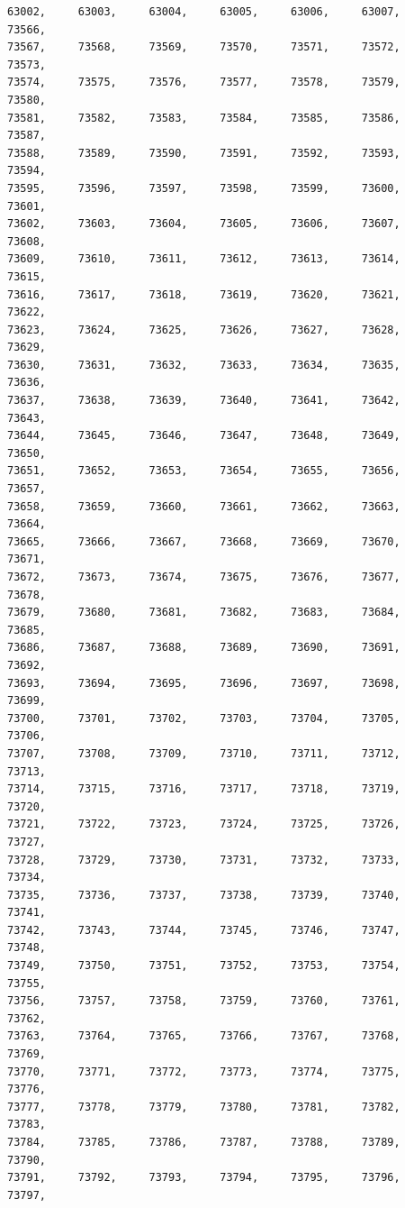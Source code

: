 \documentclass[a4paper,11pt]{report}
\begin{document}
\begin{verbatim}
63002,     63003,     63004,     63005,     63006,     63007,     73566,     
73567,     73568,     73569,     73570,     73571,     73572,     73573,     
73574,     73575,     73576,     73577,     73578,     73579,     73580,     
73581,     73582,     73583,     73584,     73585,     73586,     73587,     
73588,     73589,     73590,     73591,     73592,     73593,     73594,     
73595,     73596,     73597,     73598,     73599,     73600,     73601,     
73602,     73603,     73604,     73605,     73606,     73607,     73608,     
73609,     73610,     73611,     73612,     73613,     73614,     73615,     
73616,     73617,     73618,     73619,     73620,     73621,     73622,     
73623,     73624,     73625,     73626,     73627,     73628,     73629,     
73630,     73631,     73632,     73633,     73634,     73635,     73636,     
73637,     73638,     73639,     73640,     73641,     73642,     73643,     
73644,     73645,     73646,     73647,     73648,     73649,     73650,     
73651,     73652,     73653,     73654,     73655,     73656,     73657,     
73658,     73659,     73660,     73661,     73662,     73663,     73664,     
73665,     73666,     73667,     73668,     73669,     73670,     73671,     
73672,     73673,     73674,     73675,     73676,     73677,     73678,     
73679,     73680,     73681,     73682,     73683,     73684,     73685,     
73686,     73687,     73688,     73689,     73690,     73691,     73692,     
73693,     73694,     73695,     73696,     73697,     73698,     73699,     
73700,     73701,     73702,     73703,     73704,     73705,     73706,     
73707,     73708,     73709,     73710,     73711,     73712,     73713,     
73714,     73715,     73716,     73717,     73718,     73719,     73720,     
73721,     73722,     73723,     73724,     73725,     73726,     73727,     
73728,     73729,     73730,     73731,     73732,     73733,     73734,     
73735,     73736,     73737,     73738,     73739,     73740,     73741,     
73742,     73743,     73744,     73745,     73746,     73747,     73748,     
73749,     73750,     73751,     73752,     73753,     73754,     73755,     
73756,     73757,     73758,     73759,     73760,     73761,     73762,     
73763,     73764,     73765,     73766,     73767,     73768,     73769,     
73770,     73771,     73772,     73773,     73774,     73775,     73776,     
73777,     73778,     73779,     73780,     73781,     73782,     73783,     
73784,     73785,     73786,     73787,     73788,     73789,     73790,     
73791,     73792,     73793,     73794,     73795,     73796,     73797,     

\end{verbatim}
\end{document}

